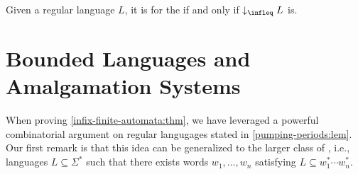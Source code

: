 \begin{corollary}
    \label{reg-wqo-iff-dwclosed-wqo:cor}
    Given a regular language $L$, it is  
    for the  if and only if 
    $\dwset[\infleq] L$ is.
\end{corollary}

\section{Bounded Languages and Amalgamation Systems}
\label{infixes-amalgamation:sec}

When proving \cref{infix-finite-automata:thm}, we have leveraged a powerful
combinatorial argument on regular langugages stated in
\cref{pumping-periods:lem}. Our first remark is that this idea can
be generalized to the larger class of , i.e.,
languages $L \subseteq \Sigma^*$ such that there exists words $w_1, \dots, w_n$
satisfying $L \subseteq w_1^* \cdots w_n^*$.

